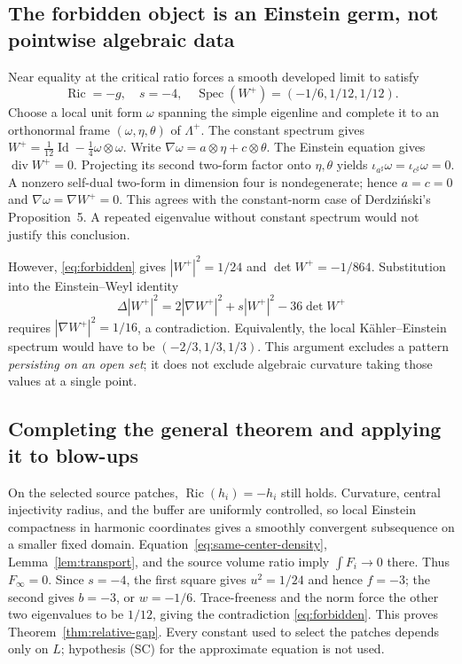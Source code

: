 \documentclass[a4paper,11pt]{article}
\numberwithin{equation}{section}
\theoremstyle{definition}
\newcommand{\Ric}{\operatorname{Ric}}
\newcommand{\spec}{\operatorname{Spec}}
\newcommand{\Id}{\operatorname{Id}}
\begin{document}
\subsection{The forbidden object is an Einstein germ, not pointwise algebraic data}
Near equality at the critical ratio forces a smooth developed limit to satisfy
\begin{equation}\label{eq:forbidden}
\Ric=-g,\quad s=-4,\quad
\spec(W^+)=(-1/6,1/12,1/12).
\end{equation}
Choose a local unit form $\omega$ spanning the simple eigenline and complete it to an orthonormal frame $(\omega,\eta,\theta)$ of $\Lambda^+$. The constant spectrum gives
$W^+=\frac1{12}\Id-\frac14\omega\otimes\omega$. Write
$\nabla\omega=a\otimes\eta+c\otimes\theta$.
The Einstein equation gives $\operatorname{div}W^+=0$. Projecting its second two-form factor onto $\eta,\theta$ yields
$\iota_{a^\sharp}\omega=\iota_{c^\sharp}\omega=0$.
A nonzero self-dual two-form in dimension four is nondegenerate; hence $a=c=0$ and $\nabla\omega=\nabla W^+=0$. This agrees with the constant-norm case of Derdzi\'nski's Proposition~5\cite{Derdzinski}. A repeated eigenvalue without constant spectrum would not justify this conclusion.

However, \eqref{eq:forbidden} gives $|W^+|^2=1/24$ and $\det W^+=-1/864$. Substitution into the Einstein--Weyl identity
\[
\Delta|W^+|^2=2|\nabla W^+|^2+s|W^+|^2-36\det W^+
\]
requires $|\nabla W^+|^2=1/16$, a contradiction. Equivalently, the local K\"ahler--Einstein spectrum would have to be $(-2/3,1/3,1/3)$. This argument excludes a pattern \emph{persisting on an open set}; it does not exclude algebraic curvature taking those values at a single point.

\subsection{Completing the general theorem and applying it to blow-ups}\label{sec:relative-application}
On the selected source patches, $\Ric(h_i)=-h_i$ still holds. Curvature, central injectivity radius, and the buffer are uniformly controlled, so local Einstein compactness in harmonic coordinates gives a smoothly convergent subsequence on a smaller fixed domain. Equation~\eqref{eq:same-center-density}, Lemma~\ref{lem:transport}, and the source volume ratio imply $\int F_i\to0$ there. Thus $F_\infty=0$. Since $s=-4$, the first square gives $u^2=1/24$ and hence $f=-3$; the second gives $b=-3$, or $w=-1/6$. Trace-freeness and the norm force the other two eigenvalues to be $1/12$, giving the contradiction \eqref{eq:forbidden}. This proves Theorem~\ref{thm:relative-gap}. Every constant used to select the patches depends only on $L$; hypothesis (SC) for the approximate equation is not used.
\end{document}
